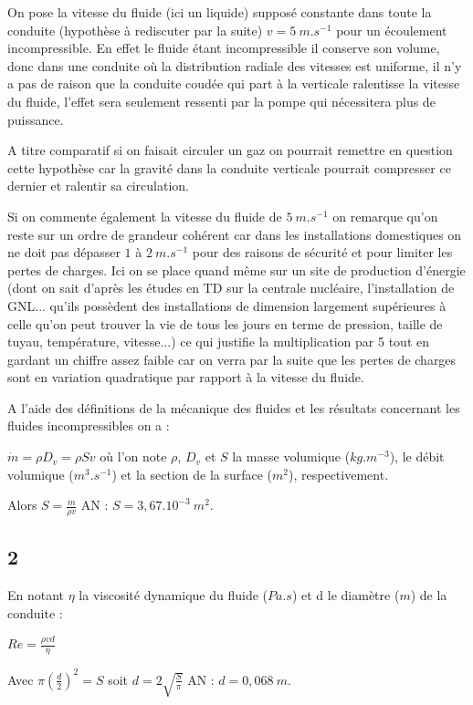 \documentclass[12pt]{article}
\begin{document}
On pose la vitesse du fluide (ici un liquide) supposé constante dans toute la conduite (hypothèse à rediscuter par la suite) $v=5 \ m.s^{-1}$ pour un écoulement incompressible. En effet le fluide étant incompressible il conserve son volume, donc dans une conduite où la distribution radiale des vitesses est uniforme, il n'y a pas de raison que la conduite coudée qui part à la verticale ralentisse la vitesse du fluide, l'effet sera seulement ressenti par la pompe qui nécessitera plus de puissance.

A titre comparatif si on faisait circuler un gaz on pourrait remettre en question cette hypothèse car la gravité dans la conduite verticale pourrait compresser ce dernier et ralentir sa circulation. 

Si on commente également la vitesse du fluide de $5 \ m.s^{-1}$ on remarque qu'on reste sur un ordre de grandeur cohérent car dans les installations domestiques on ne doit pas dépasser $1$ à $2 \ m.s^{-1}$ pour des raisons de sécurité et pour limiter les pertes de charges. Ici on se place quand même sur un site de production d'énergie (dont on sait d'après les études en TD sur la centrale nucléaire, l'installation de GNL... qu'ils possèdent des installations de dimension largement supérieures à celle qu'on peut trouver la vie de tous les jours en terme de pression, taille de tuyau, température, vitesse...) ce qui justifie la multiplication par 5 tout en gardant un chiffre assez faible car on verra par la suite que les pertes de charges sont en variation quadratique par rapport à la vitesse du fluide.

A l'aide des définitions de la mécanique des fluides et les résultats concernant les fluides incompressibles on a :

$\dot m = \rho D_v = \rho S v$ où l'on note $\rho$, $D_v$ et $S$ la masse volumique ($kg.m^{-3}$), le débit volumique ($m^3.s^{-1}$) et la section de la surface ($m^2$), respectivement.

Alors $\boxed{S = \frac {\dot m}{\rho v}}$ AN : $S=3,67.10^{-3} \ m^2$.

\subsection*{2}
En notant $\eta$ la viscosité dynamique du fluide ($Pa.s$) et d le diamètre ($m$) de la conduite :

$Re=\frac{\rho v d}{\eta}$

Avec $\pi (\frac{d}{2})^2=S$ soit $\boxed{d=2 \sqrt {\frac{S}{\pi}}}$ AN : $d=0,068 \ m$.
\end{document}
